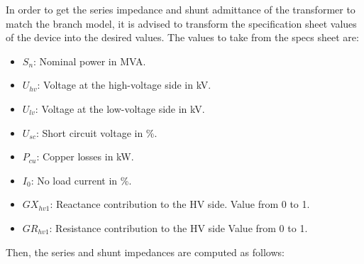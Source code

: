 \documentclass{tufte-book}
\begin{document}
In order to get the series impedance and shunt admittance of the transformer to match the branch model, it is advised to transform the specification sheet values of the device into the desired values. The values to take from the specs sheet are: \newline
\begin{itemize}
	\item $S_n$: Nominal power in MVA.
	\item $U_{hv}$: Voltage at the high-voltage side in kV.
	\item $U_{lv}$: Voltage at the low-voltage side in kV.
	\item $U_{sc}$: Short circuit voltage in \%.
	\item $P_{cu}$: Copper losses in kW.
	\item $I_0$: No load current in \%.
	\item $GX_{hv1}$: Reactance contribution to the HV side. Value from 0 to 1.
	\item $GR_{hv1}$: Resistance contribution to the HV side Value from 0 to 1.\newline
\end{itemize}

Then, the series and shunt impedances are computed as follows:
\end{document}
